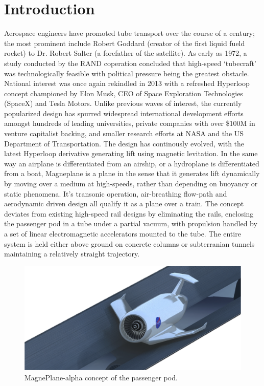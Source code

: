 \documentclass[heading.tex]{subfiles}
\begin{document}
\section{Introduction}

	Aerospace engineers have promoted tube transport over the course of a century;
	the most prominent include Robert Goddard \cite{Goddard} (creator of the first liquid fueld
	rocket) to Dr. Robert Salter (a forefather of the satellite). As early as 1972,
	a study conducted by the RAND coperation concluded that high-speed `tubecraft'
	was technologically feasible with political pressure being the greatest
	obstacle.\cite{RAND} National interest was once again rekindled in 2013 with a refreshed
	Hyperloop concept championed by Elon Musk, CEO of Space Exploration
	Technologies (SpaceX) and Tesla Motors.\cite{Musk}
	Unlike previous waves of interest, the currently
	popularized design has spurred widespread international development efforts
	amongst hundreds of leading universities, private companies with over \$100M
	in venture capitalist backing, and smaller research efforts at NASA and the
	US Department of Transportation. \cite{Chin}
	The design has continously evolved, with the latest Hyperloop derivative
	generating lift using magnetic levitation.
	In the same way an airplane is differentiated from an airship,
	or a hydroplane is differentiated from a boat,
	Magneplane is a plane in the sense that it generates lift dynamically
	by moving over a medium at high-speeds,
	rather than depending on buoyancy or static phenomena.
	It's transonic operation, air-breathing flow-path and aerodynamic
	driven design all qualify it as a plane over a train.
	The concept deviates from existing high-speed rail designs by eliminating
	the rails, enclosing the passenger pod in a tube under a partial vacuum,
	with propulsion handled by a set of linear electromagnetic accelerators
	mounted to the tube. The entire system is held either above ground on concrete
	columns or subterranian tunnels maintaining a relatively straight trajectory.

	\begin{figure}[hbtp]
		\centering
		\includegraphics[width=.85\textwidth]{images/MagnePlane.png}
		\caption[MagnePlane Concept Sketch]{MagnePlane-alpha concept of the passenger pod.}
		\label{f:hyperloopSketch}
	\end{figure}
\end{document}
